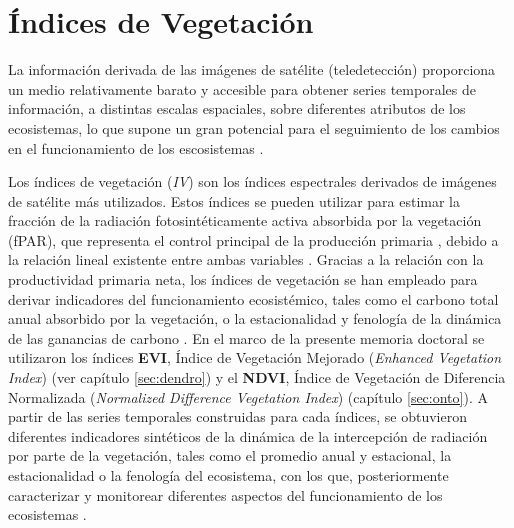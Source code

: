 \section{Índices de Vegetación}\label{sec:metodologia:modis-iv}

La información derivada de las imágenes de satélite (teledetección) proporciona un medio relativamente barato y accesible para obtener series temporales de información, a distintas escalas espaciales, sobre
diferentes atributos de los ecosistemas, lo que supone un gran potencial para el seguimiento de los cambios en el funcionamiento de los escosistemas \autocites{Pettorellietal2014SatelliteRemote,Pettorellietal2018SatelliteRemote,Cabelloetal2012EcosystemFunctioning, Alcarazetal2006IdentificationCurrent,AlcarazSeguraetal2015CambiosProductividad}.

Los índices de vegetación (\emph{IV}) son los índices espectrales derivados de imágenes de satélite más utilizados. Estos índices se pueden utilizar para estimar la fracción de la radiación fotosintéticamente activa absorbida por la vegetación (fPAR), que representa el control principal de la producción primaria
\autocite{Monteith1972SolarRadiation}, debido a la relación lineal existente entre ambas variables \autocites{Hatfieldetal1984InterceptedPhotosynthetically}. Gracias a la relación con la productividad primaria neta, los índices de vegetación se han empleado para derivar indicadores del funcionamiento ecosistémico, tales como el carbono total anual absorbido por la vegetación, o la estacionalidad y fenología de la dinámica de las ganancias de carbono \autocites{CabelloParuelo2009TeledeteccionEstudios,
AlcarazSeguraetal2009BaselineCharacterization,AlcarazSeguraetal2009UseDescriptors,Cazorlaetal2020RemoteSensingbased,Dionisioetal2012SatelliteBasedMonitoring}. En el marco de la presente memoria doctoral se utilizaron los índices \textbf{EVI}, Índice de Vegetación Mejorado (\emph{Enhanced Vegetation Index}) (ver capítulo \ref{sec:dendro}) y
el \textbf{NDVI}, Índice de Vegetación de Diferencia Normalizada (\emph{Normalized Difference Vegetation Index}) (capítulo \ref{sec:onto}). A partir de las series temporales construidas para cada índices, se obtuvieron
diferentes indicadores sintéticos de la dinámica de la intercepción de radiación por parte de la vegetación, tales como el promedio anual y estacional, la estacionalidad o la fenología del ecosistema, con los
que, posteriormente caracterizar y monitorear diferentes aspectos del funcionamiento de los ecosistemas
\autocite{Cabelloetal2012EcosystemFunctioning}.

